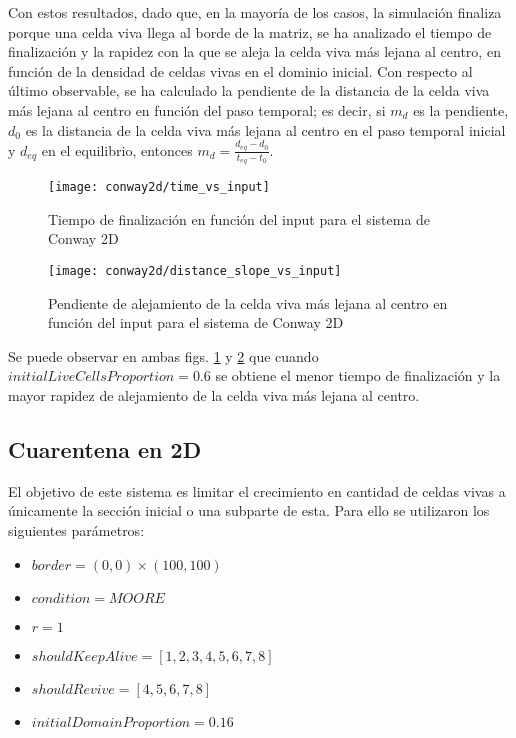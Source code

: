 Con estos resultados, dado que, en la mayoría de los casos, la simulación finaliza porque una celda viva llega al borde de la matriz,
se ha analizado el tiempo de finalización y la rapidez con la que se aleja la celda viva más lejana al centro, en función de la densidad de celdas vivas en el dominio inicial.
Con respecto al último observable, se ha calculado la pendiente de la distancia de la celda viva más lejana al centro en función del paso temporal;
es decir, si $m_{d}$ es la pendiente, $d_{0}$ es la distancia de la celda viva más lejana al centro en el paso temporal inicial y $d_{eq}$ en el equilibrio, entonces $m_{d} = \frac{d_{eq} - d_0}{t_{eq} - t_{0}}$.

\begin{figure}[H]
    \centering
    \texttt{[image: conway2d/time\_vs\_input]}
    \caption{Tiempo de finalización en función del input para el sistema de Conway 2D}
    \label{fig:conway2d_time_vs_input}
\end{figure}
\begin{figure}[H]
    \centering
    \texttt{[image: conway2d/distance\_slope\_vs\_input]}
    \caption{Pendiente de alejamiento de la celda viva más lejana al centro en función del input para el sistema de Conway 2D}
    \label{fig:conway2d_distance_slope_vs_input}
\end{figure}

Se puede observar en ambas figs. \ref{fig:conway2d_time_vs_input} y \ref{fig:conway2d_distance_slope_vs_input} que cuando
$initialLiveCellsProportion = 0.6$ se obtiene el menor tiempo de finalización y la mayor rapidez de alejamiento de la celda viva más lejana al centro.

\subsection{Cuarentena en 2D}\label{subsec:cuarentena-2D}

El objetivo de este sistema es limitar el crecimiento en cantidad de celdas vivas a únicamente la sección inicial o una subparte de esta. Para ello
se utilizaron los siguientes parámetros:

\begin{itemize}
    \item $border = (0, 0) \times (100, 100)$
    \item $condition = MOORE$
    \item $r = 1$
    \item $shouldKeepAlive = [1, 2, 3, 4, 5, 6, 7, 8]$
    \item $shouldRevive = [4, 5, 6, 7, 8]$
    \item $initialDomainProportion = 0.16$
\end{itemize}

